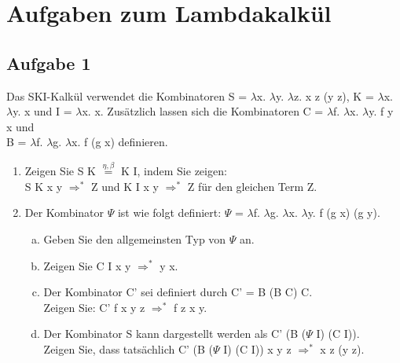 \documentclass{scrartcl}
\newcommand{\same}{$\stackrel{\eta,\beta}{=}$}
\renewcommand{\l}{$\lambda$}
\begin{document}
\section*{Aufgaben zum Lambdakalkül}
\subsection*{Aufgabe 1}
Das SKI-Kalkül verwendet die Kombinatoren S = \l x. \l y. \l z. x z (y z), K = \l x. \l y. x und I = \l x. x. Zusätzlich lassen sich die Kombinatoren C = \l f. \l x. \l y. f y x und\\ B = \l f. \l g. \l x. f (g x) definieren.
\begin{enumerate}[1.]
\item Zeigen Sie S K \same{} K I, indem Sie zeigen:\\
S K x y $\Rightarrow^*$ Z und K I x y $\Rightarrow^*$ Z für den gleichen Term Z.
\item Der Kombinator $\Psi$ ist wie folgt definiert: $\Psi$ = \l f. \l g. \l x. \l y. f (g x) (g y).
\begin{enumerate}[(a)]
\item Geben Sie den allgemeinsten Typ von $\Psi$ an.
\item Zeigen Sie C I x y $\Rightarrow^*$ y x.
\item Der Kombinator C' sei definiert durch C' = B (B C) C.\\
Zeigen Sie: C' f x y z $\Rightarrow^*$ f z x y.
\item Der Kombinator S kann dargestellt werden als C' (B ($\Psi$ I) (C I)).\\ Zeigen Sie, dass tatsächlich C' (B ($\Psi$ I) (C I)) x y z $\Rightarrow^*$ x z (y z).
\end{enumerate} 
\end{enumerate}
\end{document}
